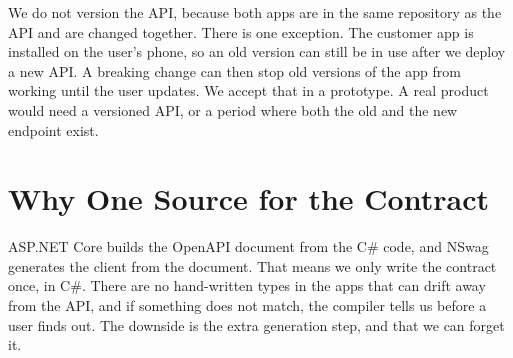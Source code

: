 \documentclass[a4paper,11pt]{article}
\begin{document}
We do not version the API, because both apps are in the same repository as the API and are changed together. There is one exception. The customer app is installed on the user's phone, so an old version can still be in use after we deploy a new API. A breaking change can then stop old versions of the app from working until the user updates. We accept that in a prototype. A real product would need a versioned API, or a period where both the old and the new endpoint exist.

\section{Why One Source for the Contract}
ASP.NET Core builds the OpenAPI document from the C\# code, and NSwag generates the client from the document. That means we only write the contract once, in C\#. There are no hand-written types in the apps that can drift away from the API, and if something does not match, the compiler tells us before a user finds out. The downside is the extra generation step, and that we can forget it.

\printbibliography
\end{document}
